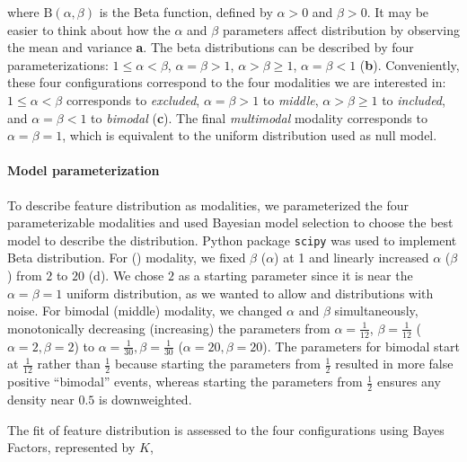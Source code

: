 where $\mathrm{B}\left(\alpha, \beta\right)$ is the Beta function, defined by $\alpha > 0$ and $\beta > 0$. It may be easier to think about how the $\alpha$ and $\beta$ parameters affect distribution by observing the mean and variance \textbf{a}. The beta distributions can be described by four parameterizations: $1 \leq \alpha < \beta$, $\alpha = \beta > 1$, $\alpha > \beta \geq 1$, $\alpha = \beta < 1$ (\textbf{b}). Conveniently, these four configurations correspond to the four modalities we are interested in: $1 \leq \alpha < \beta$ corresponds to \emph{excluded}, $\alpha = \beta > 1$ to \emph{middle}, $\alpha > \beta \geq 1$ to \emph{included}, and $\alpha = \beta < 1$ to \emph{bimodal} (\textbf{c}). The final \emph{multimodal} modality corresponds to $\alpha = \beta = 1$, which is equivalent to the uniform distribution used as null model.



\paragraph{Model parameterization}
To describe feature distribution as modalities, we parameterized the four parameterizable modalities and used Bayesian model selection to choose the best model to describe the distribution. Python package \texttt{scipy}\cite{Oliphant:2007dm,Millman:2011jv} was used to implement Beta distribution.
For \1 (\0) modality, we fixed $\beta$ ($\alpha$) at 1 and linearly increased $\alpha$ ($\beta$) from $2$ to $20$ (d). We chose $2$ as a starting parameter since it is near the $\alpha=\beta=1$ uniform distribution, as we wanted to allow \0 and \1 distributions with noise. For bimodal (middle) modality, we changed $\alpha$ and $\beta$ simultaneously, monotonically decreasing (increasing) the parameters from $\alpha=\frac{1}{12}$, $\beta = \frac{1}{12}$ ($\alpha = 2, \beta = 2$) to $\alpha = \frac{1}{30}, \beta = \frac{1}{30}$ ($\alpha = 20, \beta=20$). The parameters for bimodal start at $\frac{1}{12}$ rather than $\frac{1}{2}$ because starting the parameters from $\frac{1}{2}$ resulted in more false positive ``bimodal'' events, whereas starting the parameters from $\frac{1}{2}$ ensures any density near $0.5$ is downweighted.


The fit of feature distribution is assessed to the four configurations using Bayes Factors, represented by $K$,

